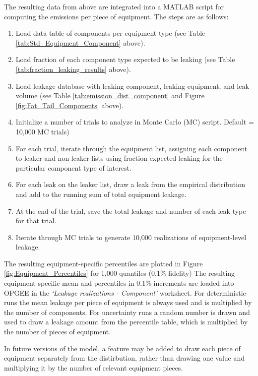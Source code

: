 \documentclass[11pt]{report}
\newcommand{\sheet}[1]{\textit{`{#1}'}}
\begin{document}
{{{{The resulting data from above are integrated into a MATLAB script for computing the emissions per piece of equipment.  The steps are as follows:
\begin{enumerate}
\item Load data table of components per equipment type (see Table \ref{tab:Std_Equipment_Component} above).
\item Load fraction of each component type expected to be leaking (see Table \ref{tab:fraction_leaking_results} above).
\item Load leakage database with leaking component, leaking equipment, and leak volume (see Table \ref{tab:emission_dist_component}  and Figure \ref{fig:Fat_Tail_Components} above).
\item Initialize a number of trials to analyze in Monte Carlo (MC) script. Default = 10,000 MC trials)
\item For each trial, iterate through the equipment list, assigning each component to leaker and non-leaker lists using fraction expected leaking for the particular component type of interest.
\item For each leak on the leaker list, draw a leak from the empirical distribution and add to the running sum of total equipment leakage.
\item At the end of the trial, save the total leakage and number of each leak type for that trial.
\item Iterate through MC trials to generate 10,000 realizations of equipment-level leakage.
\end{enumerate}

The resulting equipment-specific percentiles are plotted in Figure \ref{fig:Equipment_Percentiles} for 1,000 quantiles (0.1\% fidelity) The resulting equipment specific mean and percentiles in 0.1\% increments are loaded into OPGEE in the \sheet{Leakage realizations - Component} worksheet.  For deterministic runs the mean leakage per piece of equipment is always used and is multiplied by the number of components. For uncertainty runs a random number is drawn and used to draw a leakage amount from the percentile table, which is multiplied by the number of pieces of equipment.

In future versions of the model, a feature may be added to draw each piece of equipment separately from the distirbution, rather than drawing one value and multiplying it by the number of relevant equipment pieces.



}}}}
\end{document}

